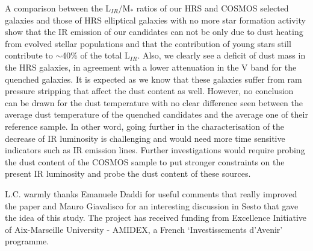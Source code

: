 \documentclass[traditabstract]{aa} %
\begin{document}
A comparison between the L$_{IR}/$M$_*$ ratios of our HRS and COSMOS selected galaxies and those of HRS elliptical galaxies with no more star formation activity show that the IR emission of our candidates can not be only due to dust heating from evolved stellar populations and that the contribution of young stars still contribute to $\sim$40\% of the total L$_{IR}$.
Also, we clearly see a deficit of dust mass in the HRS galaxies, in agreement with a lower attenuation in the V band for the quenched galaxies.  
It is expected as we know that these galaxies suffer from ram pressure stripping that affect the dust content as well.
However, no conclusion can be drawn for the dust temperature with no clear difference seen between the average dust temperature of the quenched candidates and the average one of their reference sample.
In other word, going further in the characterisation of the decrease of IR luminosity is challenging and would need more time sensitive indicators such as IR emission lines.
Further investigations would require probing the dust content of the COSMOS sample to put stronger constraints on the present IR luminosity and probe the dust content of these sources.


\begin{acknowledgements}
L.C. warmly thanks Emanuele Daddi for useful comments that really improved the paper and Mauro Giavalisco for an interesting discussion in Sesto that gave the idea of this study.
The project has received funding from Excellence Initiative of Aix-Marseille
University - AMIDEX, a French ‘Investissements d’Avenir’ programme.
\end{acknowledgements}
\end{document}
